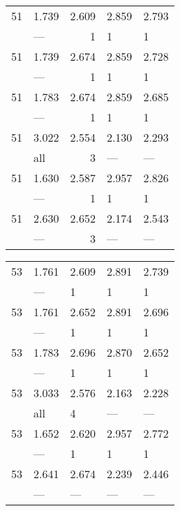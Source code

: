 \begin{tabular}{llrll}
\toprule
 51 & 1.739 & 2.609 & 2.859 & 2.793 \\
    & ---   & 1     & 1     & 1     \\
 51 & 1.739 & 2.674 & 2.859 & 2.728 \\
    & ---   & 1     & 1     & 1     \\
 51 & 1.783 & 2.674 & 2.859 & 2.685 \\
    & ---   & 1     & 1     & 1     \\
 51 & 3.022 & 2.554 & 2.130 & 2.293 \\
    & all   & 3     & ---   & ---   \\
 51 & 1.630 & 2.587 & 2.957 & 2.826 \\
    & ---   & 1     & 1     & 1     \\
 51 & 2.630 & 2.652 & 2.174 & 2.543 \\
    & ---   & 3     & ---   & ---   \\
\bottomrule
\end{tabular}
\begin{tabular}{lllll}
\toprule
 53 & 1.761 & 2.609 & 2.891 & 2.739 \\
    & ---   & 1     & 1     & 1     \\
 53 & 1.761 & 2.652 & 2.891 & 2.696 \\
    & ---   & 1     & 1     & 1     \\
 53 & 1.783 & 2.696 & 2.870 & 2.652 \\
    & ---   & 1     & 1     & 1     \\
 53 & 3.033 & 2.576 & 2.163 & 2.228 \\
    & all   & 4     & ---   & ---   \\
 53 & 1.652 & 2.620 & 2.957 & 2.772 \\
    & ---   & 1     & 1     & 1     \\
 53 & 2.641 & 2.674 & 2.239 & 2.446 \\
    & ---   & ---   & ---   & ---   \\
\bottomrule
\end{tabular}
